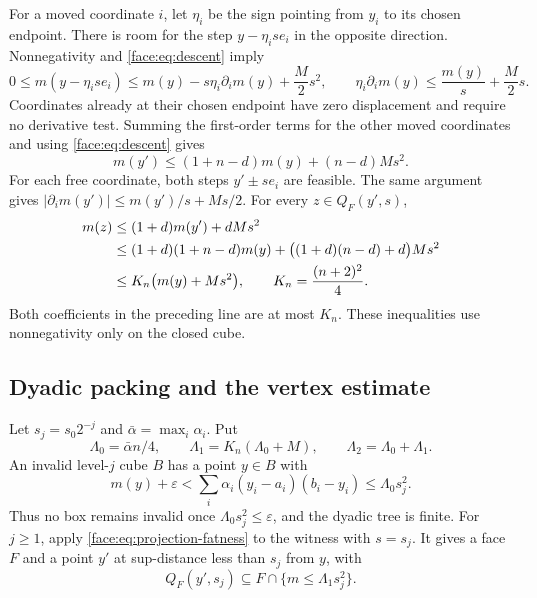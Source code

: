 For a moved coordinate $i$, let $\eta_i$ be the sign pointing from
$y_i$ to its chosen endpoint.  There is room for the step
$y-\eta_i s e_i$ in the opposite direction.  Nonnegativity and
\eqref{face:eq:descent} imply
\[
 0\le m(y-\eta_i s e_i)
 \le m(y)-s\eta_i\partial_i m(y)+\frac M2s^2,
 \qquad
 \eta_i\partial_i m(y)\le\frac{m(y)}s+\frac M2s.
\]
Coordinates already at their chosen endpoint have zero displacement
and require no derivative test.  Summing the first-order terms for
the other moved coordinates and using \eqref{face:eq:descent} gives
\begin{equation}
 \label{face:eq:projection-height}
 m(y')\le(1+n-d)m(y)+(n-d)Ms^2.
\end{equation}
For each free coordinate, both steps $y'\pm se_i$ are feasible.
The same argument gives
$|\partial_i m(y')|\le m(y')/s+Ms/2$.
For every $z\in Q_F(y',s)$,
\begin{align}
 m(z)&\le(1+d)m(y')+dMs^2\notag\\
 &\le(1+d)(1+n-d)m(y)
       +\bigl((1+d)(n-d)+d\bigr)Ms^2\notag\\
 &\le K_n\bigl(m(y)+Ms^2\bigr),
 \qquad K_n=\frac{(n+2)^2}{4}.
 \label{face:eq:projection-fatness}
\end{align}
Both coefficients in the preceding line are at most $K_n$.
These inequalities use nonnegativity only on the closed cube.

\subsection{Dyadic packing and the vertex estimate}
\label{app:face:characterization}

Let $s_j=s_0 2^{-j}$ and $\bar\alpha=\max_i\alpha_i$.
Put
\[
 \Lambda_0=\bar\alpha n/4,\qquad
 \Lambda_1=K_n(\Lambda_0+M),\qquad
 \Lambda_2=\Lambda_0+\Lambda_1.
\]
An invalid level-$j$ cube $B$ has a point $y\in B$ with
\begin{equation}
 \label{face:eq:dyadic-witness}
 m(y)+\varepsilon
 <\sum_i\alpha_i(y_i-a_i)(b_i-y_i)
 \le\Lambda_0s_j^2.
\end{equation}
Thus no box remains invalid once
$\Lambda_0s_j^2\le\varepsilon$, and the dyadic tree is finite.
For $j\ge1$, apply \eqref{face:eq:projection-fatness} to the witness
with $s=s_j$.  It gives a face $F$ and a point $y'$ at sup-distance
less than $s_j$ from $y$, with
\[
 Q_F(y',s_j)\subseteq F\cap\{m\le\Lambda_1s_j^2\}.
\]


